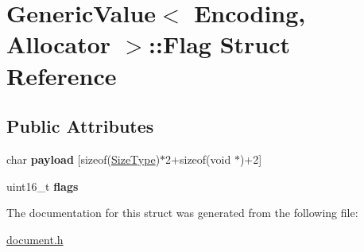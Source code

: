 \hypertarget{a00104}{}\section{Generic\+Value$<$ Encoding, Allocator $>$\+:\+:Flag Struct Reference}
\label{a00104}
\subsection*{Public Attributes}
\begin{DoxyCompactItemize}
\item 
char {\bfseries payload} \mbox{[}sizeof(\hyperlink{a00677_a5ed6e6e67250fadbd041127e6386dcb5}{Size\+Type})$\ast$2+sizeof(void $\ast$)+2\mbox{]}\hypertarget{a00104_ac5512252dcb1f2e4b0231dbde504c656}{}\label{a00104_ac5512252dcb1f2e4b0231dbde504c656}

\item 
uint16\+\_\+t {\bfseries flags}\hypertarget{a00104_ac91f08067dcc0003fc78e870ca9b2d5d}{}\label{a00104_ac91f08067dcc0003fc78e870ca9b2d5d}

\end{DoxyCompactItemize}


The documentation for this struct was generated from the following file\+:\begin{DoxyCompactItemize}
\item 
\hyperlink{a00473}{document.\+h}\end{DoxyCompactItemize}
